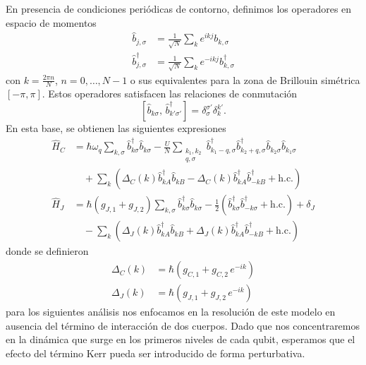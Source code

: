 En presencia de condiciones periódicas de contorno, definimos los operadores en espacio de momentos
\begin{subequations}
    \begin{align}
        \hat b_{j, \sigma} &= \frac{1}{\sqrt{N}}\sum_{k} e^{ikj} b_{k, \sigma}\\
        \hat b_{j, \sigma}^\dag &= \frac{1}{\sqrt{N}}\sum_{k} e^{-ikj} b_{k, \sigma}^\dag
    \end{align}
\end{subequations}
con $k = \frac{2\pi n}{N}$, $n = 0, \ldots, N-1$ o sus equivalentes para la zona de Brillouin simétrica $[-\pi, \pi]$. Estos operadores satisfacen las relaciones de conmutación
\begin{equation}
    \left[\hat b_{k \sigma}, \, \hat b^\dag_{k' \sigma'}\right] = \delta_{\sigma}^{\sigma'} \delta_{k}^{k'}.
\end{equation}
En esta base, se obtienen las siguientes expresiones
\begin{subequations}
    \begin{align}
        \hat H_C &= \hbar \omega_q \sum_{k,\sigma}\hat b^\dag_{k\sigma}\hat b_{k\sigma} 
                - \frac{U}{N}\sum_{\substack{k_1,k_2 \\ q,\sigma}} 
                \hat b_{k_1-q,\sigma}^\dag \hat b^\dag_{k_2+q,\sigma} \hat b_{k_2\sigma}\hat b_{k_1\sigma}
                \nonumber\\
               &\quad + \sum_{k}\left(\Delta_C(k)\hat b^\dag_{kA} \hat b_{kB} -\Delta_C(k)\hat b^\dag_{kA}\hat b_{-kB}^\dag+ \text{h.c.}\right)\label{eq:k_space_capacitive_hamiltonian}\\
        \hat H_J &= \hbar(g_{J,1} + g_{J,2})\sum_{k,\sigma}
                \hat b^\dag_{k\sigma}\hat b_{k\sigma} 
                - \frac{1}{2}\left(\hat b^\dag_{k\sigma}\hat b^\dag_{-k\sigma} + \text{h.c.}\right)+\delta_J\nonumber\\
               &\quad -\sum_{k}\left(\Delta_J(k)\hat b^\dag_{kA} \hat b_{kB} +\Delta_J(k)\hat b^\dag_{kA}\hat b_{-kB}^\dag+ \text{h.c.}\right) \label{eq:k_space_josephson_hamiltonian}
    \end{align}
\end{subequations}
donde se definieron
\begin{subequations}
    \begin{align}
        \Delta_C(k) &= \hbar (g_{C,1} + g_{C,2}\, e^{-ik})\\
        \Delta_J(k) &= \hbar (g_{J,1} + g_{J,2}\, e^{-ik})
    \end{align}
\end{subequations}
para los siguientes análisis nos enfocamos en la resolución de este modelo en ausencia del término de interacción de dos cuerpos. Dado que nos concentraremos en la dinámica que surge en los primeros niveles de cada qubit, esperamos que el efecto del término Kerr pueda ser introducido de forma perturbativa.